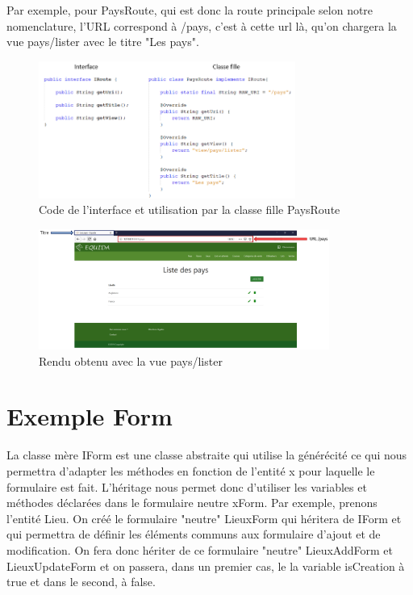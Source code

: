 		\noindent
		Par exemple, pour PaysRoute, qui est donc la route principale selon notre nomenclature, l'URL correspond à /pays, c'est à cette url là, qu'on chargera la vue pays/lister avec le titre "Les pays".

		\begin{figure}[H]
			\centering\includegraphics[width=0.75\textwidth, keepaspectratio]{res/paysRoute.png}
			\caption{Code de l'interface et utilisation par la classe fille PaysRoute}
		\end{figure}

		\begin{figure}[H]
			\centering\includegraphics[width=0.85\textwidth, keepaspectratio]{res/renduPaysRoute.png}
			\caption{Rendu obtenu avec la vue pays/lister}
		\end{figure}

	\section{Exemple Form}

		La classe mère IForm est une classe abstraite qui utilise la générécité ce qui nous permettra d'adapter les méthodes en fonction de l'entité x pour laquelle le formulaire est fait. L'héritage nous permet donc d'utiliser les variables et méthodes déclarées dans le formulaire neutre xForm.\newline
		Par exemple, prenons l'entité Lieu. On créé le formulaire "neutre" LieuxForm qui héritera de IForm et qui permettra de définir les éléments communs aux formulaire d'ajout et de modification.\newline
		On fera donc hériter de ce formulaire "neutre" LieuxAddForm et LieuxUpdateForm et on passera, dans un premier cas, le la variable isCreation à true et dans le second, à false.

